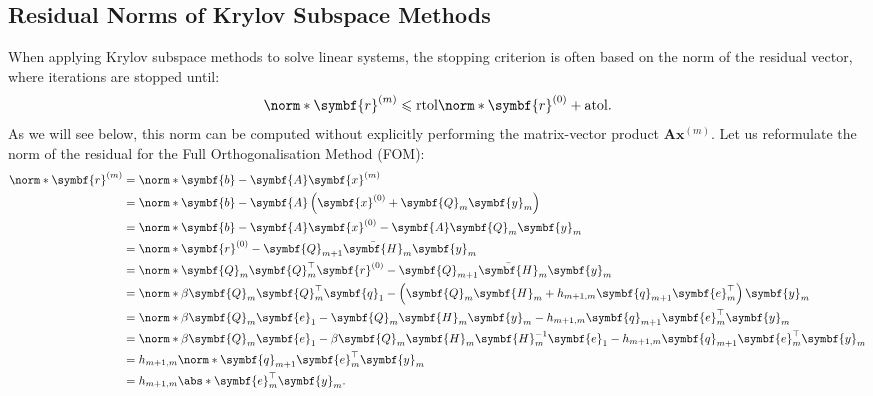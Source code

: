 \documentclass{article}
\begin{document}
\subsection{Residual Norms of Krylov Subspace Methods}
When applying Krylov subspace methods to solve linear systems, the
stopping criterion is often based on the norm of the residual vector,
where iterations are stopped until:
\begin{equation*}
    \norm*{\symbf{r}^{\left( m \right)}} \leqslant \mathrm{rtol} \norm*{\symbf{r}^{\left( 0 \right)}} + \mathrm{atol}.
\end{equation*}
As we will see below, this norm can be computed without explicitly
performing the matrix-vector product \(\symbf{A} \symbf{x}^{\left( m \right)}\).
Let us reformulate the norm of the residual for the Full
Orthogonalisation Method (FOM):
\begin{align*}
    \norm*{\symbf{r}^{\left( m \right)}} & = \norm*{\symbf{b} - \symbf{A} \symbf{x}^{\left( m \right)}}                                                                                                  \\
                                         & = \norm*{\symbf{b} - \symbf{A} \left( \symbf{x}^{\left( 0 \right)} + \symbf{Q}_m \symbf{y}_m \right)}                                                         \\
                                         & = \norm*{\symbf{b} - \symbf{A} \symbf{x}^{\left( 0 \right)} - \symbf{A} \symbf{Q}_m \symbf{y}_m}                                                              \\
                                         & = \norm*{\symbf{r}^{\left( 0 \right)} - \symbf{Q}_{m+1} \bar{\symbf{H}}_m \symbf{y}_m}                                                                        \\
                                         & = \norm*{\symbf{Q}_m \symbf{Q}_m^\top \symbf{r}^{\left( 0 \right)} - \symbf{Q}_{m+1} \bar{\symbf{H}}_m \symbf{y}_m}                                           \\
                                         & = \norm*{\beta \symbf{Q}_m \symbf{Q}_m^\top \symbf{q}_1 - \left( \symbf{Q}_m \symbf{H}_m + h_{m+1,m} \symbf{q}_{m+1} \symbf{e}_m^\top \right) \symbf{y}_m}    \\
                                         & = \norm*{\beta \symbf{Q}_m \symbf{e}_1 - \symbf{Q}_m \symbf{H}_m \symbf{y}_m - h_{m+1,m} \symbf{q}_{m+1} \symbf{e}_m^\top \symbf{y}_m}                        \\
                                         & = \norm*{\beta \symbf{Q}_m \symbf{e}_1 - \beta \symbf{Q}_m \symbf{H}_m \symbf{H}_m^{-1} \symbf{e}_1 - h_{m+1,m} \symbf{q}_{m+1} \symbf{e}_m^\top \symbf{y}_m} \\
                                         & = h_{m+1,m} \norm*{\symbf{q}_{m+1} \symbf{e}_m^\top \symbf{y}_m}                                                                                              \\
                                         & = h_{m+1,m} \abs*{\symbf{e}_m^\top \symbf{y}_m}.
\end{align*}
\end{document}
